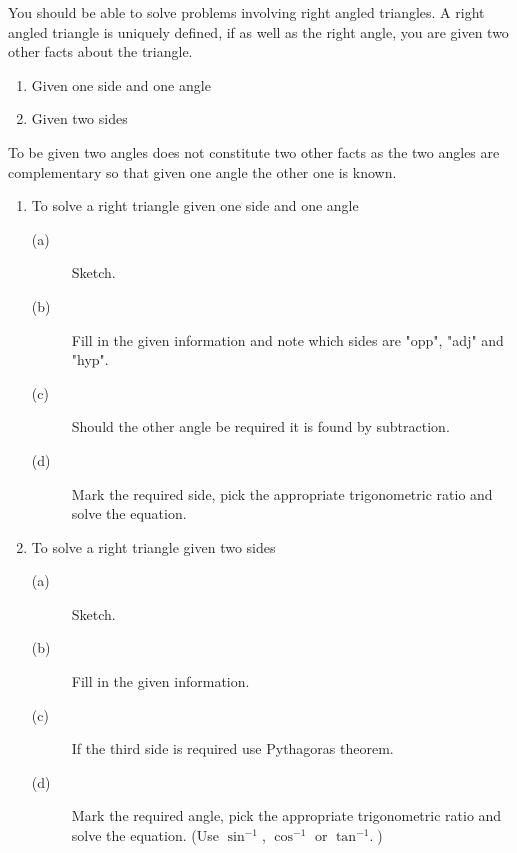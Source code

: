 You should be able to solve problems involving right angled triangles. A
right angled triangle is uniquely defined, if as well as the right angle, you are given two other facts about the triangle. 


\begin{enumerate}
\item Given one side and one angle 

\item Given two sides \end{enumerate}


To be given two angles does not constitute two other facts as the two angles are complementary so that given one angle the other one is known.



\begin{enumerate}
\item To solve a right triangle given one side and one angle 


\begin{description}
\item [(a)] Sketch. 

\item [(b)]
Fill in the given information and note which sides are "opp", "adj" and "hyp". 

\item [(c)]
Should the other angle be required it is found by subtraction. 

\item [(d)]
Mark the required side, pick the appropriate trigonometric ratio and solve the equation. \end{description}

\item To solve a right triangle given two sides 


\begin{description}
\item [(a)] Sketch. 

\item [(b)]
Fill in the given information. 

\item [(c)] If the third side
is required use Pythagoras theorem. 

\item [(d)] Mark the required
angle, pick the appropriate trigonometric ratio and solve the equation. (Use $\sin ^{ -1}$, $\cos ^{ -1}$ or $\tan ^{ -1}\text{.}$) \end{description}\end{enumerate}

